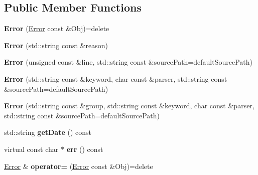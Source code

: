 \subsection*{Public Member Functions}
\begin{DoxyCompactItemize}
\item 
\hypertarget{classstb_1_1Error_a164d493ebaeb01cae57d27572e1c5122}{{\bfseries Error} (\hyperlink{classstb_1_1Error}{Error} const \&Obj)=delete}\label{classstb_1_1Error_a164d493ebaeb01cae57d27572e1c5122}

\item 
\hypertarget{classstb_1_1Error_ab0b6bc245915e5ab56205c75fbc62c04}{{\bfseries Error} (std\+::string const \&reason)}\label{classstb_1_1Error_ab0b6bc245915e5ab56205c75fbc62c04}

\item 
\hypertarget{classstb_1_1Error_a55fdff142eeb3b1bfc65f25826462670}{{\bfseries Error} (unsigned const \&line, std\+::string const \&source\+Path=default\+Source\+Path)}\label{classstb_1_1Error_a55fdff142eeb3b1bfc65f25826462670}

\item 
\hypertarget{classstb_1_1Error_a88766f6c9e79450819a6226373bca503}{{\bfseries Error} (std\+::string const \&keyword, char const \&parser, std\+::string const \&source\+Path=default\+Source\+Path)}\label{classstb_1_1Error_a88766f6c9e79450819a6226373bca503}

\item 
\hypertarget{classstb_1_1Error_a5c0899c77e8bd5ea13ba60d48f3e6adf}{{\bfseries Error} (std\+::string const \&group, std\+::string const \&keyword, char const \&parser, std\+::string const \&source\+Path=default\+Source\+Path)}\label{classstb_1_1Error_a5c0899c77e8bd5ea13ba60d48f3e6adf}

\item 
\hypertarget{classstb_1_1Error_ac0159810929ea5d676ef31e161017bf1}{std\+::string {\bfseries get\+Date} () const }\label{classstb_1_1Error_ac0159810929ea5d676ef31e161017bf1}

\item 
\hypertarget{classstb_1_1Error_adb6b777e10687277cd0d11a91f8278bd}{virtual const char $\ast$ {\bfseries err} () const }\label{classstb_1_1Error_adb6b777e10687277cd0d11a91f8278bd}

\item 
\hypertarget{classstb_1_1Error_aa39b36abd3371e2f8480654a647636d4}{\hyperlink{classstb_1_1Error}{Error} \& {\bfseries operator=} (\hyperlink{classstb_1_1Error}{Error} const \&Obj)=delete}\label{classstb_1_1Error_aa39b36abd3371e2f8480654a647636d4}

\end{DoxyCompactItemize}
